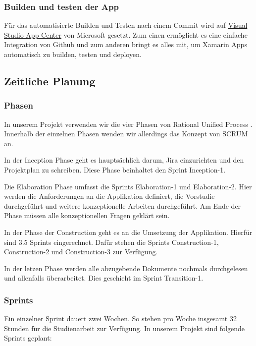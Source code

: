 \subsubsection*{Builden und testen der App}
Für das automatisierte Builden und Testen nach einem Commit wird auf \href{https://appcenter.ms/orgs/BrainingOutOfBox/apps/BrainingOutOfBox-App}{Visual Studio App Center} von Microsoft gesetzt. Zum einen ermöglicht es eine einfache Integration von Github und zum anderen bringt es alles mit, um Xamarin Apps automatisch zu builden, testen und deployen. 

\subsection{Zeitliche Planung}

\subsubsection*{Phasen}
In unserem Projekt verwenden wir die vier Phasen von Rational Unified Process \cite{RUP}. Innerhalb der einzelnen Phasen wenden wir allerdings das Konzept von SCRUM \cite{SCRUM} an.  
\begin{description}[leftmargin=!,labelwidth=\widthof{\bfseries Construction Phase}]
	\item [Inception Phase] In der Inception Phase geht es hauptsächlich darum, Jira einzurichten und den Projektplan zu schreiben. Diese Phase beinhaltet den Sprint Inception-1.
	\item [Elaboration Phase] Die Elaboration Phase umfasst die Sprints Elaboration-1 und Elaboration-2. Hier werden die Anforderungen an die Applikation definiert, die Vorstudie durchgeführt und weitere konzeptionelle Arbeiten durchgeführt. Am Ende der Phase müssen alle konzeptionellen Fragen geklärt sein. 
	\item [Construction Phase] In der Phase der Construction geht es an die Umsetzung der Applikation. Hierfür sind 3.5 Sprints eingerechnet. Dafür stehen die Sprints Construction-1, Construction-2 und Construction-3 zur Verfügung.
	\item [Transition Phase] In der letzen Phase werden alle abzugebende Dokumente nochmals durchgelesen und allenfalls überarbeitet. Dies geschieht im Sprint Transition-1.
\end{description}

\subsubsection*{Sprints}
Ein einzelner Sprint dauert zwei Wochen. So stehen pro Woche insgesamt 32 Stunden für die Studienarbeit zur Verfügung. In unserem Projekt sind folgende Sprints geplant:

